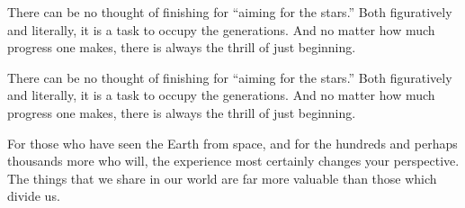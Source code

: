 There can be no thought of finishing for \enquote{aiming for the stars.} Both figuratively and literally, it is a task to occupy the generations. And no matter how much progress one makes, there is always the thrill of just beginning.

There can be no thought of finishing for \enquote{aiming for the stars.} Both figuratively and literally, it is a task to occupy the generations. And no matter how much progress one makes, there is always the thrill of just beginning.

For those who have seen the Earth from space, and for the hundreds and perhaps thousands more who will, the experience most certainly changes your perspective. The things that we share in our world are far more valuable than those which divide us. 
